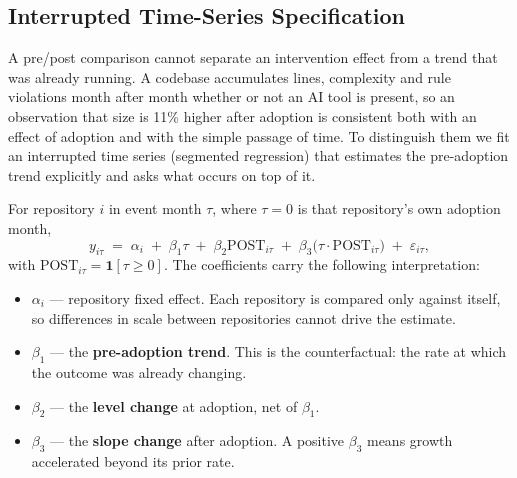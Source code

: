 %
%


\subsection{Interrupted Time-Series Specification}
\label{sec:its}

A pre/post comparison cannot separate an intervention effect from a trend that
was already running. A codebase accumulates lines, complexity and rule
violations month after month whether or not an AI tool is present, so an
observation that size is 11\% higher after adoption is consistent both with an
effect of adoption and with the simple passage of time. To distinguish them we
fit an interrupted time series (segmented regression) that estimates the
pre-adoption trend explicitly and asks what occurs on top of it.

For repository $i$ in event month $\tau$, where $\tau = 0$ is that
repository's own adoption month,
\begin{equation}
  y_{i\tau} \;=\; \alpha_i \;+\; \beta_1 \tau \;+\; \beta_2 \mathrm{POST}_{i\tau}
            \;+\; \beta_3 \bigl(\tau \cdot \mathrm{POST}_{i\tau}\bigr)
            \;+\; \varepsilon_{i\tau},
  \label{eq:its}
\end{equation}
with $\mathrm{POST}_{i\tau} = \mathbf{1}[\tau \ge 0]$. The coefficients carry
the following interpretation:

\begin{itemize}
  \item $\alpha_i$ — repository fixed effect. Each repository is compared only
    against itself, so differences in scale between repositories cannot drive
    the estimate.
  \item $\beta_1$ — the \textbf{pre-adoption trend}. This is the
    counterfactual: the rate at which the outcome was already changing.
  \item $\beta_2$ — the \textbf{level change} at adoption, net of $\beta_1$.
  \item $\beta_3$ — the \textbf{slope change} after adoption. A positive
    $\beta_3$ means growth accelerated beyond its prior rate.
\end{itemize}

